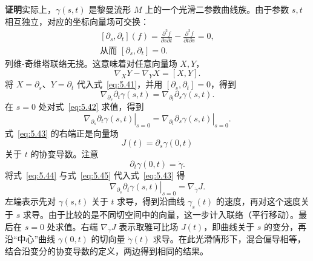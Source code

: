 \textbf{证明}\quad 实际上，$\gamma(s,t)$ 是黎曼流形 $M$ 上的一个光滑二参数曲线族。由于参数 $s,t$ 相互独立，对应的坐标向量场可交换：
\begin{equation*}
  \begin{gathered}
    [\partial_s,\partial_t](f)=\frac{\partial^2f}{\partial s\partial t}
                              -\frac{\partial^2f}{\partial t\partial s}=0,\\
    \text{从而 }[\partial_s,\partial_t]=0.
  \end{gathered}
  \tag{5.40}\label{eq:5.40}
\end{equation*}
列维-奇维塔联络无挠。这意味着对任意向量场 $X,Y$，
\begin{equation*}
  \nabla_XY-\nabla_YX=[X,Y].
  \tag{5.41}\label{eq:5.41}
\end{equation*}
将 $X=\partial_s$、$Y=\partial_t$ 代入式~\eqref{eq:5.41}，并用 $[\partial_s,\partial_t]=0$，得到
\begin{equation*}
  \nabla_{\partial_s}\partial_t\gamma(s,t)
    =\nabla_{\partial_t}\partial_s\gamma(s,t).
  \tag{5.42}\label{eq:5.42}
\end{equation*}
在 $s=0$ 处对式~\eqref{eq:5.42} 求值，得到
\begin{equation*}
  \left.\nabla_{\partial_s}\partial_t\gamma(s,t)\right|_{s=0}
    =\left.\nabla_{\partial_t}\partial_s\gamma(s,t)\right|_{s=0}.
  \tag{5.43}\label{eq:5.43}
\end{equation*}
式~\eqref{eq:5.43} 的右端正是向量场
\begin{equation*}
  J(t)=\partial_s\gamma(0,t)
  \tag{5.44}\label{eq:5.44}
\end{equation*}
关于 $t$ 的协变导数。注意
\begin{equation*}
  \partial_t\gamma(0,t)=\dot\gamma.
  \tag{5.45}\label{eq:5.45}
\end{equation*}
将式~\eqref{eq:5.44} 与式~\eqref{eq:5.45} 代入式~\eqref{eq:5.43} 得
\begin{equation*}
  \left.\nabla_{\partial_s}\partial_t\gamma(s,t)\right|_{s=0}
     =\nabla_{\dot\gamma}J.
  \tag{5.46}\label{eq:5.46}
\end{equation*}
左端表示先对 $\gamma(s,t)$ 关于 $t$ 求导，得到沿曲线 $\gamma_s(t)$ 的速度，再对这个速度关于 $s$ 求导。由于比较的是不同切空间中的向量，这一步计入联络（平行移动）。最后在 $s=0$ 处求值。右端 $\nabla_{\dot\gamma}J$ 表示取雅可比场 $J(t)$，即曲线关于 $s$ 的变分，再沿“中心”曲线 $\gamma(0,t)$ 的切向量 $\dot\gamma(t)$ 求导。在此光滑情形下，混合偏导相等，结合沿变分的协变导数的定义，两边得到相同的结果。


